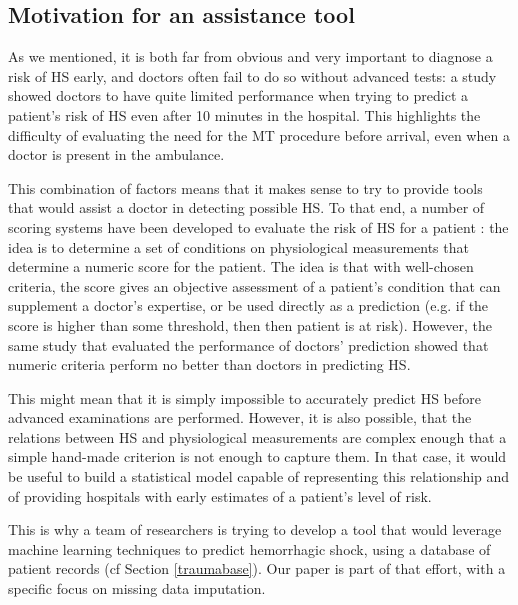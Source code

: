 		\subsection{Motivation for an assistance tool}

As we mentioned, it is both far from obvious and very important to diagnose a risk of HS early, and doctors often fail to do so without advanced tests: a study \cite{pommerening2015gestalt} showed doctors to have quite limited performance when trying to predict a patient's risk of HS even after 10 minutes in the hospital. This highlights the difficulty of evaluating the need for the MT procedure before arrival, even when a doctor is present in the ambulance.

This combination of factors means that it makes sense to try to provide tools that would assist a doctor in detecting possible HS. To that end, a number of scoring systems have been developed to evaluate the risk of HS for a patient \cite{nunez2009ABC} \cite{gonzalez2016resussitation_outcome} \cite{maegele2011TASH}: the idea is to determine a set of conditions on physiological measurements that determine a numeric score for the patient. The idea is that with well-chosen criteria, the score gives an objective assessment of a patient's condition that can supplement a doctor's expertise, or be used directly as a prediction (e.g. if the score is higher than some threshold, then then patient is at risk). However, the same study that evaluated the performance of doctors' prediction \cite{pommerening2015gestalt} showed that numeric criteria perform no better than doctors in predicting HS.

This might mean that it is simply impossible to accurately predict HS before advanced examinations are performed. However, it is also possible, that the relations between HS and physiological measurements are complex enough that a simple hand-made criterion is not enough to capture them. In that case, it would be useful to build a statistical model capable of representing this relationship and of providing hospitals with early estimates of a patient's level of risk. 

This is why a team of researchers is trying to develop a tool that would leverage machine learning techniques to predict hemorrhagic shock, using a database of patient records (cf Section \ref{traumabase}). Our paper is part of that effort, with a specific focus on missing data imputation.

